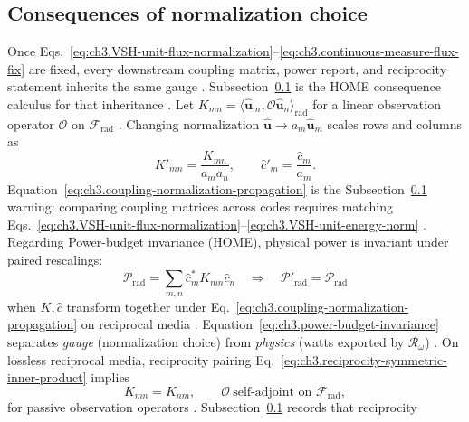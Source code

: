\subsection{Consequences of normalization choice}
\label{sec:ch354}
Once Eqs.~\eqref{eq:ch3.VSH-unit-flux-normalization}--\eqref{eq:ch3.continuous-measure-flux-fix} are fixed, every
downstream coupling matrix, power report, and reciprocity statement inherits the same gauge \cite{stratton1941}.
Subsection~\ref{sec:ch354} is the HOME consequence calculus for that inheritance \cite{hansen1988}.
Let \(K_{mn}=\langle \widehat{\mathbf{u}}_{m},\mathcal{O}\widehat{\mathbf{u}}_{n}\rangle_{\mathrm{rad}}\) for a linear
observation operator \(\mathcal{O}\) on \(\mathcal{F}_{\mathrm{rad}}\) \cite{harrington2001}. Changing
normalization \(\widehat{\mathbf{u}}\to a_{m}\widehat{\mathbf{u}}_{m}\) scales rows and columns as
\begin{equation}
\label{eq:ch3.coupling-normalization-propagation}
K'_{mn}
=
\frac{K_{mn}}{a_{m}a_{n}},
\qquad
\widehat{c}'_{m}
=
\frac{\widehat{c}_{m}}{a_{m}}.
\end{equation}
Equation~\eqref{eq:ch3.coupling-normalization-propagation} is the Subsection~\ref{sec:ch354} warning: comparing coupling
matrices across codes requires matching Eqs.~\eqref{eq:ch3.VSH-unit-flux-normalization}--\eqref{eq:ch3.VSH-unit-energy-norm}
\cite{harrington2001}.
Regarding Power-budget invariance (HOME), physical power is invariant under paired rescalings:
\begin{equation}
\label{eq:ch3.power-budget-invariance}
\mathcal{P}_{\mathrm{rad}}
=
\sum_{m,n}\widehat{c}_{m}^{*}K_{mn}\widehat{c}_{n}
\quad\Rightarrow\quad
\mathcal{P}'_{\mathrm{rad}}=\mathcal{P}_{\mathrm{rad}}
\end{equation}
when \(K,\widehat{c}\) transform together under Eq.~\eqref{eq:ch3.coupling-normalization-propagation} on reciprocal
media \cite{stratton1941}. Equation~\eqref{eq:ch3.power-budget-invariance} separates
\emph{gauge} (normalization choice) from \emph{physics} (watts exported by \(\mathcal{R}_\omega\)) \cite{harrington2001}.
On lossless reciprocal media, reciprocity pairing Eq.~\eqref{eq:ch3.reciprocity-symmetric-inner-product} implies
\begin{equation}
\label{eq:ch3.reciprocity-coupling-symmetry}
K_{mn}=K_{nm},
\qquad
\mathcal{O}\ \text{self-adjoint on }\mathcal{F}_{\mathrm{rad}},
\end{equation}
for passive observation operators \cite{stratton1941}. Subsection~\ref{sec:ch354} records that reciprocity
